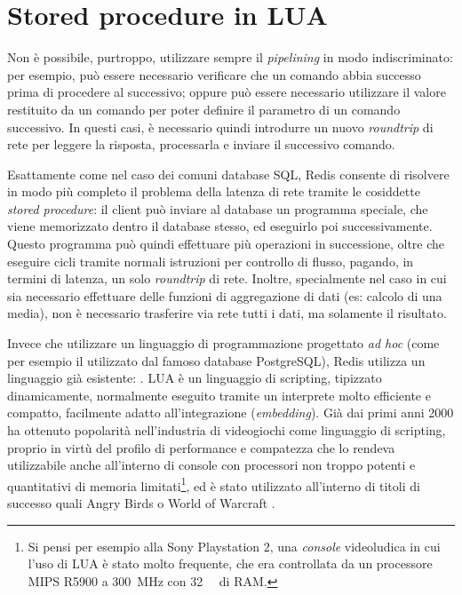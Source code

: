 \section{Stored procedure in LUA}
\label{sec:redis:lua}

Non è possibile, purtroppo, utilizzare sempre il \emph{pipelining} in modo indiscriminato: per
esempio, può essere necessario verificare che un comando abbia successo prima di procedere al
successivo; oppure può essere necessario utilizzare il valore restituito da un comando per poter definire
il parametro di un comando successivo. In questi casi, è necessario quindi introdurre un nuovo
\emph{roundtrip} di rete per leggere la risposta, processarla e inviare il successivo comando.

Esattamente come nel caso dei comuni database SQL, Redis consente di risolvere in modo più completo
il problema della latenza di rete tramite le cosiddette \emph{stored procedure}: il client può
inviare al database un programma speciale, che viene memorizzato dentro il database stesso, ed
eseguirlo poi successivamente. Questo programma può quindi effettuare più operazioni in successione,
oltre che eseguire cicli tramite normali istruzioni per controllo di flusso, pagando, in termini di
latenza, un solo \emph{roundtrip} di rete. Inoltre, specialmente nel caso in cui sia necessario
effettuare delle funzioni di aggregazione di dati (es: calcolo di una media), non è necessario
trasferire via rete tutti i dati, ma solamente il risultato.

Invece che utilizzare un linguaggio di programmazione progettato \emph{ad hoc} (come per esempio il
 utilizzato dal
famoso database PostgreSQL), Redis utilizza un linguaggio già esistente:
. LUA è un linguaggio di scripting, tipizzato dinamicamente,
normalmente eseguito tramite un interprete molto efficiente e compatto, facilmente adatto
all'integrazione (\emph{embedding}). Già dai primi anni 2000 ha ottenuto popolarità nell'industria
di videogiochi come linguaggio di scripting, proprio in virtù del profilo di performance e
compatezza che lo rendeva utilizzabile anche all'interno di console con processori non troppo
potenti e quantitativi di memoria limitati\footnote{Si pensi per esempio alla Sony Playstation 2,
una \emph{console} videoludica in cui l'uso di LUA è stato molto frequente, che era controllata da
un processore MIPS R5900 a \SI{300}{\mega\hertz} con \SI{32}{\mebi\byte} di RAM.}, ed è stato
utilizzato all'interno di titoli di successo quali Angry Birds \cite{lua-angry} o World of Warcraft
\cite{lua-wow}.

